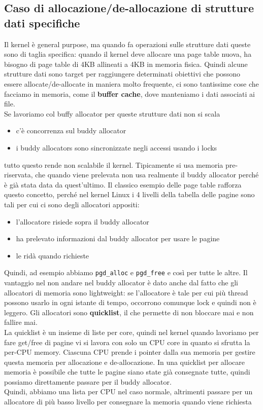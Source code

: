 \documentclass[12pt, oneside]{extbook}
\begin{document}
\subsection{Caso di allocazione/de-allocazione di strutture dati specifiche}
Il kernel è general purpose, ma quando fa operazioni sulle strutture dati queste sono di taglia specifica: quando il kernel deve allocare una page table nuova, ha bisogno di page table di 4KB allineati a 4KB in memoria fisica. Quindi alcune strutture dati sono target per raggiungere determinati obiettivi che possono essere allocate/de-allocate in maniera molto frequente, ci sono tantissime cose che facciamo in memoria, come il \textbf{buffer cache}, dove manteniamo i dati associati ai file.\\Se lavoriamo col buffy allocator per queste strutture dati non si scala
\begin{itemize}
\item c'è concorrenza sul buddy allocator
\item i buddy allocators sono sincronizzate negli accessi usando i locks
\end{itemize}
tutto questo rende non scalabile il kernel. Tipicamente si usa memoria pre-riservata, che quando viene prelevata non usa realmente il buddy allocator perché è già stata data da quest'ultimo. Il classico esempio delle page table rafforza questo concetto, perché nel kernel Linux i 4 livelli della tabella delle pagine sono tali per cui ci sono degli allocatori appositi:
\begin{itemize}
\item l'allocatore risiede sopra il buddy allocator
\item ha prelevato informazioni dal buddy allocator per usare le pagine
\item le ridà quando richieste
\end{itemize} 
Quindi, ad esempio abbiamo \texttt{pgd\_alloc} e \texttt{pgd\_free} e così per tutte le altre. Il vantaggio nel non andare nel buddy allocator è dato anche dal fatto che gli allocatori di memoria sono lightweight: se l'allocatore è tale per cui più thread possono usarlo in ogni istante di tempo, occorrono comunque lock e quindi non è leggero. Gli allocatori sono \textbf{quicklist}, il che permette di non bloccare mai e non fallire mai.\\La quicklist è un insieme di liste per core, quindi nel kernel quando lavoriamo per fare get/free di pagine vi si lavora con solo un CPU core in quanto si sfrutta la per-CPU memory. Ciascuna CPU prende i pointer dalla sua memoria per gestire questa memoria per allocazione e de-allocazione. In una quicklist per allocare memoria è possibile che tutte le pagine siano state già consegnate tutte, quindi possiamo direttamente passare per il buddy allocator.\\Quindi, abbiamo una lista per CPU nel caso normale, altrimenti passare per un allocatore di più basso livello per consegnare la memoria quando viene richiesta
\end{document}
